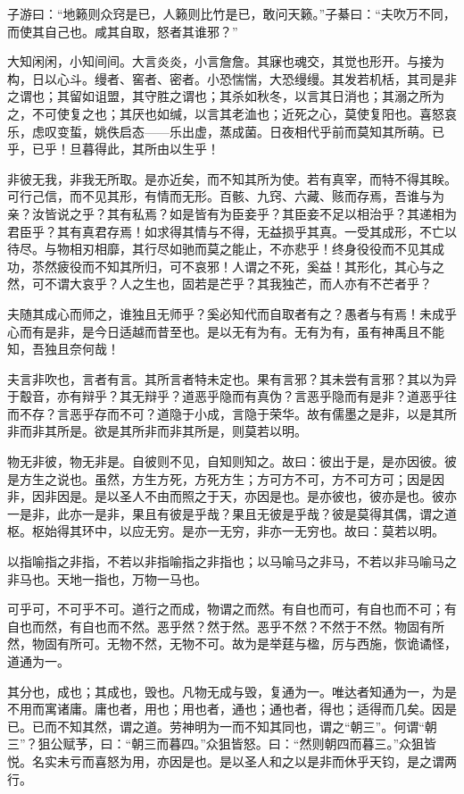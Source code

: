\documentclass[12pt,UTF8]{ctexbook}
\begin{document}
子游曰：“地籁则众窍是已，人籁则比竹是已，敢问天籁。”子綦曰：“夫吹万不同，而使其自己也。咸其自取，怒者其谁邪？”

大知闲闲，小知间间。大言炎炎，小言詹詹。其寐也魂交，其觉也形开。与接为构，日以心斗。缦者、窖者、密者。小恐惴惴，大恐缦缦。其发若机栝，其司是非之谓也；其留如诅盟，其守胜之谓也；其杀如秋冬，以言其日消也；其溺之所为之，不可使复之也；其厌也如缄，以言其老洫也；近死之心，莫使复阳也。喜怒哀乐，虑叹变蜇，姚佚启态——乐出虚，蒸成菌。日夜相代乎前而莫知其所萌。已乎，已乎！旦暮得此，其所由以生乎！

非彼无我，非我无所取。是亦近矣，而不知其所为使。若有真宰，而特不得其眹。可行己信，而不见其形，有情而无形。百骸、九窍、六藏、赅而存焉，吾谁与为亲？汝皆说之乎？其有私焉？如是皆有为臣妾乎？其臣妾不足以相治乎？其递相为君臣乎？其有真君存焉！如求得其情与不得，无益损乎其真。一受其成形，不亡以待尽。与物相刃相靡，其行尽如驰而莫之能止，不亦悲乎！终身役役而不见其成功，苶然疲役而不知其所归，可不哀邪！人谓之不死，奚益！其形化，其心与之然，可不谓大哀乎？人之生也，固若是芒乎？其我独芒，而人亦有不芒者乎？

夫随其成心而师之，谁独且无师乎？奚必知代而自取者有之？愚者与有焉！未成乎心而有是非，是今日适越而昔至也。是以无有为有。无有为有，虽有神禹且不能知，吾独且奈何哉！

夫言非吹也，言者有言。其所言者特未定也。果有言邪？其未尝有言邪？其以为异于鷇音，亦有辩乎？其无辩乎？道恶乎隐而有真伪？言恶乎隐而有是非？道恶乎往而不存？言恶乎存而不可？道隐于小成，言隐于荣华。故有儒墨之是非，以是其所非而非其所是。欲是其所非而非其所是，则莫若以明。

物无非彼，物无非是。自彼则不见，自知则知之。故曰：彼出于是，是亦因彼。彼是方生之说也。虽然，方生方死，方死方生；方可方不可，方不可方可；因是因非，因非因是。是以圣人不由而照之于天，亦因是也。是亦彼也，彼亦是也。彼亦一是非，此亦一是非，果且有彼是乎哉？果且无彼是乎哉？彼是莫得其偶，谓之道枢。枢始得其环中，以应无穷。是亦一无穷，非亦一无穷也。故曰：莫若以明。

以指喻指之非指，不若以非指喻指之非指也；以马喻马之非马，不若以非马喻马之非马也。天地一指也，万物一马也。

可乎可，不可乎不可。道行之而成，物谓之而然。有自也而可，有自也而不可；有自也而然，有自也而不然。恶乎然？然于然。恶乎不然？不然于不然。物固有所然，物固有所可。无物不然，无物不可。故为是举莛与楹，厉与西施，恢诡谲怪，道通为一。

其分也，成也；其成也，毁也。凡物无成与毁，复通为一。唯达者知通为一，为是不用而寓诸庸。庸也者，用也；用也者，通也；通也者，得也；适得而几矣。因是已。已而不知其然，谓之道。劳神明为一而不知其同也，谓之“朝三”。何谓“朝三”？狙公赋芧，曰：“朝三而暮四。”众狙皆怒。曰：“然则朝四而暮三。”众狙皆悦。名实未亏而喜怒为用，亦因是也。是以圣人和之以是非而休乎天钧，是之谓两行。
\end{document}

